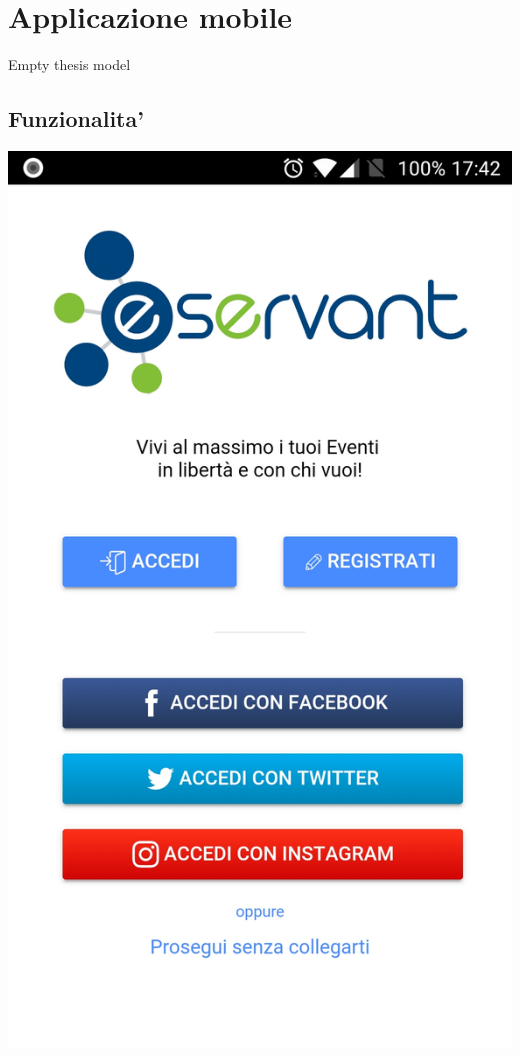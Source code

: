 \chapter{Applicazione mobile}
Empty thesis model

\section{Funzionalita'}
\includegraphics[scale=0.15]{img/cap2/1}\\

